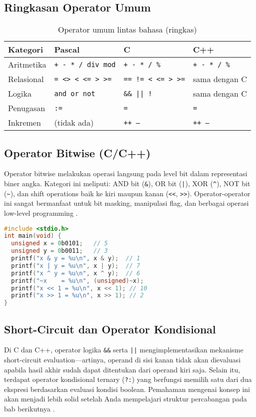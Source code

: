 \documentclass[../main.tex]{subfiles}
\begin{document}
\subsection{Ringkasan Operator Umum}
\begin{table}[H]
  \centering
  \caption{Operator umum lintas bahasa (ringkas)}
  \begin{tabular}{@{}llll@{}}
    \toprule
    Kategori & Pascal & C & C++ \\
    \midrule
    Aritmetika & \texttt{+ - * / div mod} & \texttt{+ - * / \%} & \texttt{+ - * / \%} \\
    Relasional & \texttt{= {\textless}{\textgreater} {\textless} {\textless}= {\textgreater} {\textgreater}=} & \texttt{== != {\textless} {\textless}= {\textgreater} {\textgreater}=} & sama dengan C \\
    Logika & \texttt{and or not} & \texttt{\&\& || !} & sama dengan C \\
    Penugasan & \texttt{:=} & \texttt{=} & \texttt{=} \\
    Inkremen & (tidak ada) & \texttt{++ --} & \texttt{++ --} \\
    \bottomrule
  \end{tabular}
\end{table}

\subsection{Operator Bitwise (C/C++)}
Operator bitwise melakukan operasi langsung pada level bit dalam representasi biner angka. Kategori ini meliputi: AND bit (\texttt{\&}), OR bit (\texttt{|}), XOR (\texttt{\^{}}), NOT bit (\texttt{\textasciitilde}), dan shift operations baik ke kiri maupun kanan (\texttt{<<}, \texttt{>>}). Operator-operator ini sangat bermanfaat untuk bit masking, manipulasi flag, dan berbagai operasi low-level programming \parencite{c-bitwise-ops,cpp-bitwise-ops}.

\begin{lstlisting}[language=C, caption={Contoh operator bitwise di C}]
#include <stdio.h>
int main(void) {
  unsigned x = 0b0101;   // 5
  unsigned y = 0b0011;   // 3
  printf("x & y = %u\n", x & y);  // 1
  printf("x | y = %u\n", x | y);  // 7
  printf("x ^ y = %u\n", x ^ y);  // 6
  printf("~x    = %u\n", (unsigned)~x);
  printf("x << 1 = %u\n", x << 1); // 10
  printf("x >> 1 = %u\n", x >> 1); // 2
}
\end{lstlisting}

\subsection{Short-Circuit dan Operator Kondisional}
Di C dan C++, operator logika \texttt{\&\&} serta \texttt{||} mengimplementasikan mekanisme short-circuit evaluation—artinya, operand di sisi kanan tidak akan dievaluasi apabila hasil akhir sudah dapat ditentukan dari operand kiri saja. Selain itu, terdapat operator kondisional ternary (\texttt{?:}) yang berfungsi memilih satu dari dua ekspresi berdasarkan evaluasi kondisi boolean. Pemahaman mengenai konsep ini akan menjadi lebih solid setelah Anda mempelajari struktur percabangan pada bab berikutnya \parencite{c-conditional-operator,cpp-conditional-operator}.
\end{document}
